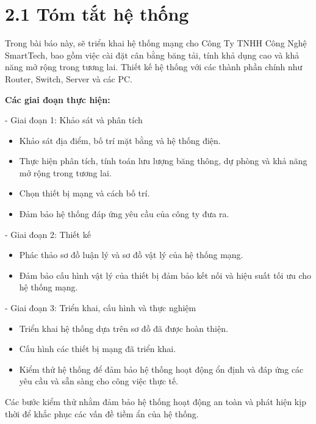
\section*{2.1 Tóm tắt hệ thống}

Trong bài báo này, sẽ triển khai hệ thống mạng cho Công Ty TNHH Công Nghệ SmartTech, bao gồm việc cài đặt cân bằng băng tải, tính khả dụng cao và khả năng mở rộng trong tương lai. Thiết kế hệ thống với các thành phần chính như Router, Switch, Server và các PC.

\textbf{Các giai đoạn thực hiện:}

- Giai đoạn 1: Khảo sát và phân tích
\begin{itemize}[left=2.5cm]
    \item Khảo sát địa điểm, bố trí mặt bằng và hệ thống điện.
    \item Thực hiện phân tích, tính toán lưu lượng băng thông, dự phòng và khả năng mở rộng trong tương lai.
    \item Chọn thiết bị mạng và cách bố trí.
    \item Đảm bảo hệ thống đáp ứng yêu cầu của công ty đưa ra.
\end{itemize}

- Giai đoạn 2: Thiết kế
\begin{itemize}[left=2.5cm]
    \item Phác thảo sơ đồ luận lý và sơ đồ vật lý của hệ thống mạng.
    \item Đảm bảo cấu hình vật lý của thiết bị đảm bảo kết nối và hiệu suất tối ưu cho hệ thống mạng.
\end{itemize}

- Giai đoạn 3: Triển khai, cấu hình và thực nghiệm
\begin{itemize}[left=2.5cm]
    \item Triển khai hệ thống dựa trên sơ đồ đã được hoàn thiện.
    \item Cấu hình các thiết bị mạng đã triển khai.
    \item Kiểm thử hệ thống để đảm bảo hệ thống hoạt động ổn định và đáp ứng các yêu cầu và sẵn sàng cho công việc thực tế.
\end{itemize}

Các bước kiểm thử nhằm đảm bảo hệ thống hoạt động an toàn và phát hiện kịp thời để khắc phục các vấn đề tiềm ẩn của hệ thống.
